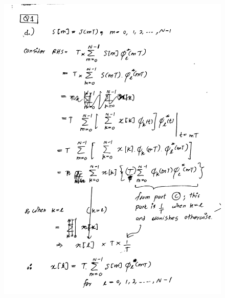 \documentclass[a4paper,11pt]{article}%
\begin{document}
\begin{figure}[!h]
	\includegraphics[scale=0.22]{figures/img4}
\end{figure}
\end{document}
